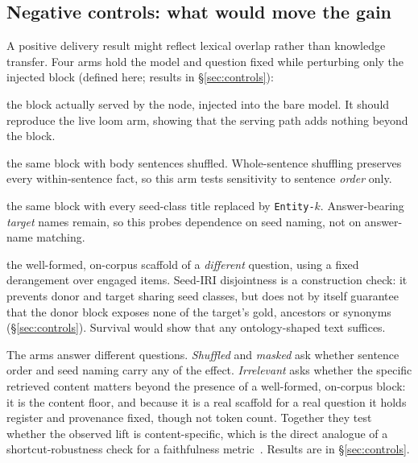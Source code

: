 \documentclass[10pt,twocolumn]{article}
\begin{document}
\subsection{Negative controls: what would move the gain}\label{sec:ceiling-controls}
A positive delivery result might reflect lexical overlap rather than knowledge transfer. Four arms hold the model and question fixed while perturbing only the injected block (defined here; results in \S\ref{sec:controls}):
\begin{description}[topsep=2pt,itemsep=1pt,leftmargin=0pt,font=\normalfont\itshape]
\item[true] the block actually served by the node, injected into the bare model. It should reproduce the live loom arm, showing that the serving path adds nothing beyond the block.
\item[shuffled] the same block with body sentences shuffled. Whole-sentence shuffling preserves every within-sentence fact, so this arm tests sensitivity to sentence \emph{order} only.
\item[masked] the same block with every seed-class title replaced by \texttt{Entity-$k$}. Answer-bearing \emph{target} names remain, so this probes dependence on seed naming, not on answer-name matching.
\item[irrelevant] the well-formed, on-corpus scaffold of a \emph{different} question, using a fixed derangement over engaged items. Seed-IRI disjointness is a construction check: it prevents donor and target sharing seed classes, but does not by itself guarantee that the donor block exposes none of the target's gold, ancestors or synonyms (\S\ref{sec:controls}). Survival would show that any ontology-shaped text suffices.
\end{description}
The arms answer different questions. \emph{Shuffled} and \emph{masked} ask whether sentence order and seed naming carry any of the effect. \emph{Irrelevant} asks whether the specific retrieved content matters beyond the presence of a well-formed, on-corpus block: it is the content floor, and because it is a real scaffold for a real question it holds register and provenance fixed, though not token count. Together they test whether the observed lift is content-specific, which is the direct analogue of a shortcut-robustness check for a faithfulness metric~\cite{gao2023alce}. Results are in \S\ref{sec:controls}.
\end{document}
